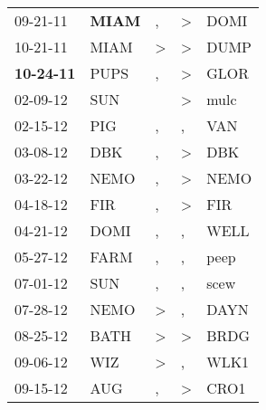 \begin{supertabular}{p{0.07\textwidth}p{0.06\textwidth}p{0.02\textwidth}p{0.02\textwidth}p{0.06\textwidth}}
          09-21-11\textsuperscript{} &  \textbf{MIAM\textsuperscript{}} &                , &  \textgreater &           DOMI\textsuperscript{} \\
          10-21-11\textsuperscript{} &           MIAM\textsuperscript{} &     \textgreater &  \textgreater &           DUMP\textsuperscript{} \\
 \textbf{10-24-11\textsuperscript{}} &           PUPS\textsuperscript{} &                , &  \textgreater &           GLOR\textsuperscript{} \\
          02-09-12\textsuperscript{} &            SUN\textsuperscript{} &                  &  \textgreater &           mulc\textsuperscript{} \\
          02-15-12\textsuperscript{} &            PIG\textsuperscript{} &                , &             , &            VAN\textsuperscript{} \\
          03-08-12\textsuperscript{} &            DBK\textsuperscript{} &                , &  \textgreater &            DBK\textsuperscript{} \\
          03-22-12\textsuperscript{} &           NEMO\textsuperscript{} &                , &  \textgreater &           NEMO\textsuperscript{} \\
          04-18-12\textsuperscript{} &            FIR\textsuperscript{} &                , &  \textgreater &            FIR\textsuperscript{} \\
          04-21-12\textsuperscript{} &           DOMI\textsuperscript{} &                , &             , &           WELL\textsuperscript{} \\
          05-27-12\textsuperscript{} &           FARM\textsuperscript{} &                , &             , &           peep\textsuperscript{} \\
          07-01-12\textsuperscript{} &            SUN\textsuperscript{} &                , &             , &           scew\textsuperscript{} \\
          07-28-12\textsuperscript{} &           NEMO\textsuperscript{} &     \textgreater &             , &           DAYN\textsuperscript{} \\
          08-25-12\textsuperscript{} &           BATH\textsuperscript{} &     \textgreater &  \textgreater &           BRDG\textsuperscript{} \\
          09-06-12\textsuperscript{} &            WIZ\textsuperscript{} &     \textgreater &             , &           WLK1\textsuperscript{} \\
          09-15-12\textsuperscript{} &            AUG\textsuperscript{} &                , &  \textgreater &           CRO1\textsuperscript{} \\

\end{supertabular}

